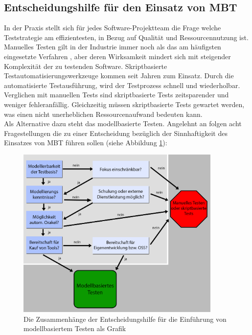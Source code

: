 \subsection{Entscheidungshilfe für den Einsatz von MBT}
\label{sec:entscheidungshilfe}
In der Praxis stellt sich für jedes Software-Projektteam die Frage welche Teststrategie am effizientesten, in Bezug auf Qualität und Ressourcennutzung ist. Manuelles Testen gilt in der Industrie immer noch als das am häufigsten eingesetzte Verfahren \cite{guldali_starthilfe_2010}, aber deren Wirksamkeit mindert sich mit steigender Komplexität der zu testenden Software. Skriptbasierte Testautomatisierungswerkzeuge kommen seit Jahren zum Einsatz. Durch die automatisierte Testausführung, wird der Testprozess schnell und wiederholbar. Verglichen mit manuellen Tests sind skriptbasierte Tests zeitsparender und weniger fehleranfällig. Gleichzeitig müssen skriptbasierte Tests gewartet werden, was einen nicht unerheblichen Ressourcenaufwand bedeuten kann.\\
Als Alternative dazu steht das modellbasierte Testen. Angelehnt an \citeauthor{guldali_starthilfe_2010} \cite{guldali_starthilfe_2010} folgen acht Fragestellungen die zu einer Entscheidung bezüglich der Sinnhaftigkeit des Einsatzes von \Gls{MBT} führen sollen (siehe Abbildung \ref{fig:entscheidungshilfe_mbt}):

\begin{figure}[h] 
  \centering
     \includegraphics[width=0.9\textwidth]{figures/entscheidungshilfe_mbt.png}
  \caption{Die Zusammenhänge der Entscheidungshilfe für die Einführung von modellbasiertem Testen als Grafik}
  \label{fig:entscheidungshilfe_mbt}
\end{figure}

